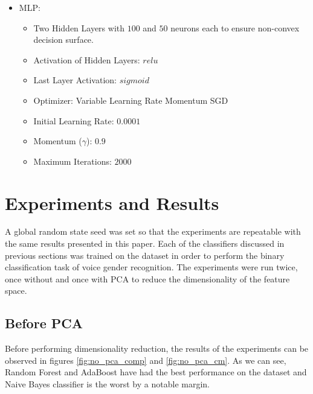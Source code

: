 \documentclass[journal,onecolumn]{IEEEtran}
\begin{document}
\begin{itemize}
  \item MLP: \begin{itemize}
    \item Two Hidden Layers with $100$ and $50$ neurons each to ensure non-convex decision surface.
    \item Activation of Hidden Layers: $relu$
    \item Last Layer Activation: $sigmoid$
    \item Optimizer: Variable Learning Rate Momentum SGD
    \item Initial Learning Rate: $0.0001$
    \item Momentum ($\gamma$): $0.9$
    \item Maximum Iterations: $2000$
  \end{itemize}
\end{itemize}

\section{Experiments and Results}
A global random state seed was set so that the experiments are repeatable with the same results presented in this paper.
Each of the classifiers discussed in previous sections was trained on the dataset in order to perform the binary classification task of voice gender recognition.
The experiments were run twice, once without and once with PCA to reduce the dimensionality of the feature space.
\subsection{Before PCA}
Before performing dimensionality reduction, the results of the experiments can be observed in figures \ref{fig:no_pca_comp} and \ref{fig:no_pca_cm}.
As we can see, Random Forest and AdaBoost have had the best performance on the dataset and Naive Bayes classifier is the worst by a notable margin.
\end{document}
